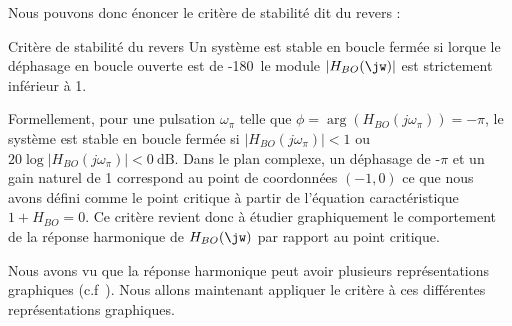 Nous pouvons donc énoncer le critère de stabilité dit du revers :
\begin{criteria}{Critère de stabilité du revers}
    Un système est stable en boucle fermée si lorque le 
    déphasage en boucle ouverte est de -180\degree~le module $|H_{BO}(\jw)|$ 
    est strictement inférieur à 1.
\end{criteria}
Formellement, pour une pulsation $\omega_{\pi}$ telle que 
$\phi=\arg{\left(H_{BO}(j\omega_\pi)\right)}=-\pi$, 
le système est stable en boucle fermée si $|H_{BO}(j\omega_\pi)|<1$ ou 
$20\log{|H_{BO}(j\omega_\pi)|}<\SI{0}{\dB}$.
Dans le plan complexe, un  déphasage de -$\pi$ et un gain naturel de 1 
correspond au point de coordonnées $(-1,0)$ ce que nous avons défini comme 
le point critique à partir de l'équation caractéristique $1+H_{BO}=0$. 
Ce critère revient donc à étudier graphiquement le comportement 
de la réponse harmonique de $H_{BO}(\jw)$ par rapport au point critique.

Nous avons vu que la réponse harmonique peut avoir plusieurs représentations
graphiques (c.f~). Nous allons maintenant appliquer le 
critère à ces différentes représentations graphiques.
\clearpage

